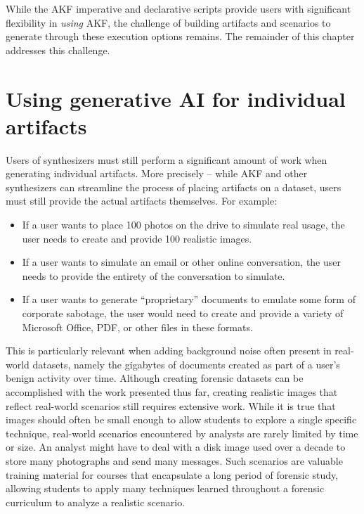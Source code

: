 \documentclass[letterpaper,12pt]{report}
\def\tightlist{}
\begin{document}
While the AKF imperative and declarative scripts provide users with
significant flexibility in \emph{using} AKF, the challenge of building
artifacts and scenarios to generate through these execution options
remains. The remainder of this chapter addresses this challenge.

\section{Using generative AI for individual
artifacts}\label{using-generative-ai-for-individual-artifacts}

Users of synthesizers must still perform a significant amount of work
when generating individual artifacts. More precisely -- while AKF and
other synthesizers can streamline the process of placing artifacts on a
dataset, users must still provide the actual artifacts themselves. For
example:

\begin{itemize}
\tightlist
\item
  If a user wants to place 100 photos on the drive to simulate real
  usage, the user needs to create and provide 100 realistic images.
\item
  If a user wants to simulate an email or other online conversation, the
  user needs to provide the entirety of the conversation to simulate.
\item
  If a user wants to generate ``proprietary'' documents to emulate some
  form of corporate sabotage, the user would need to create and provide
  a variety of Microsoft Office, PDF, or other files in these formats.
\end{itemize}

This is particularly relevant when adding background noise often present
in real-world datasets, namely the gigabytes of documents created as
part of a user's benign activity over time. Although creating forensic
datasets can be accomplished with the work presented thus far, creating
realistic images that reflect real-world scenarios still requires
extensive work. While it is true that images should often be small
enough to allow students to explore a single specific technique,
real-world scenarios encountered by analysts are rarely limited by time
or size. An analyst might have to deal with a disk image used over a
decade to store many photographs and send many messages. Such scenarios
are valuable training material for courses that encapsulate a long
period of forensic study, allowing students to apply many techniques
learned throughout a forensic curriculum to analyze a realistic
scenario.
\end{document}
